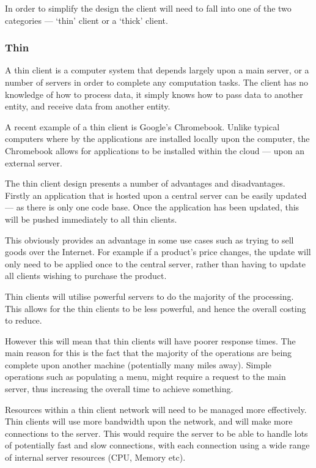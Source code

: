 In order to simplify the design the client will need to fall into one of the
two categories --- `thin' client or a `thick' client. 


\subsubsection{Thin}

A thin client is a computer system that depends largely upon a main server, or 
a number of servers in order to complete any computation tasks. The client has 
no knowledge of how to process data, it simply knows how to pass data to 
another entity, and receive data from another entity.

A recent example of a thin client is Google's Chromebook. Unlike typical 
computers where by the applications are installed locally upon the computer, 
the Chromebook allows for applications to be installed within the cloud --- 
upon an external server.

The thin client design presents a number of advantages and disadvantages. 
Firstly an application that is hosted upon a central server can be easily 
updated --- as there is only one code base. Once the application has been 
updated, this will be pushed immediately to all thin clients.

This obviously provides an advantage in some use cases such as trying to sell 
goods over the Internet. For example if a product's price changes, the update 
will only need to be applied once to the central server, rather than having to 
update all clients wishing to purchase the product.

Thin clients will utilise powerful servers to do the majority of the 
processing. This allows for the thin clients to be less powerful, and hence the
overall costing to reduce.

However this will mean that thin clients will have poorer response times. The 
main reason for this is the fact that the majority of the operations are being 
complete upon another machine (potentially many miles away). Simple operations 
such as populating a menu, might require a request to the main server, thus 
increasing the overall time to achieve something.

Resources within a thin client network will need to be managed more 
effectively. Thin clients will use more bandwidth upon the network, and will 
make more connections to the server. This would require the server to be able 
to handle lots of potentially fast and slow connections, with each connection 
using a wide range of internal server resources (CPU, Memory etc). 


